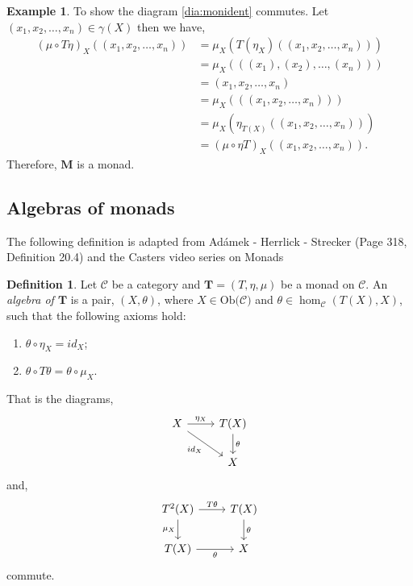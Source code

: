 \documentclass[11pt,a4paper]{article}
\theoremstyle{definition}
\newtheorem{definition}[thm]{Definition}
\newtheorem{example}[thm]{Example}
\newcommand\ho[3][]{\hom_{#1}(#2,#3)}
\newcommand\ob[1]{\mathrm{Ob(}#1\mathrm{)}}
\newcommand\cat[1]{\mathscr{#1}}
\numberwithin{equation}{section}
\begin{document}
\begin{example}
    To show the diagram \eqref{dia:monident} commutes.
    Let $(x_1,x_2,\dots,x_n)\in\gamma(X)$ then we have,
    \begin{align*}
        (\mu \circ T\eta)_X((x_1,x_2,\dots,x_n)) &= \mu_X (T(\eta_{X})((x_1,x_2,\dots,x_n))) \\
        &= \mu_{X}(((x_1),(x_2),\dots,(x_n))) \\
        &= (x_1,x_2,\dots,x_n) \\
        &= \mu_{X}(((x_1,x_2,\dots,x_n))) \\
        &= \mu_{X}(\eta_{T(X)}((x_1,x_2,\dots,x_n)))\\
        &= (\mu \circ \eta T)_{X}((x_1,x_2,\dots,x_n)).
    \end{align*}
    Therefore, $\mathbf{M}$ is a monad.
\end{example}

\subsection{Algebras of monads}
\label{ss:algofmon} 

The following definition is adapted from Adámek - Herrlick - Strecker \cite{ACC} (Page 318, Definition 20.4) and the Casters video series on Monads \cite{catsters:mon}
\begin{definition}
\label{def:algofmon}
    Let $\cat{C}$ be a category and $\mathbf{T} = (T,\eta,\mu)$ be a monad on $\cat{C}$. An \emph{algebra of $\mathbf{T}$} is a pair, $(X,\theta)$, where $X\in\ob{\cat{C}}$ and $\theta\in\ho[\cat{C}]{T(X)}{X}$, such that the following axioms hold:
    \begin{enumerate}
        \item $\theta \circ \eta_{X} = id_{X}$;
        \item $\theta \circ T\theta = \theta \circ \mu_{X}$.
    \end{enumerate}
    That is the diagrams,
    \begin{equation}
    \label{dia:monalgident}
        \begin{tikzcd}
            X \arrow[dr,"id_{X}"'] \arrow[r,"\eta_{X}"]& T(X) \arrow[d,"\theta"] \\
            & X
        \end{tikzcd}
    \end{equation}
    and,
    \begin{equation}
    \label{dia:monalgasso}
        \begin{tikzcd}
            T^2(X) \arrow[r,"T\theta"] \arrow[d,"\mu_{X}"'] & T(X) \arrow[d,"\theta"]\\
            T(X) \arrow[r,"\theta"']& X 
        \end{tikzcd}
    \end{equation}
    commute.
\end{definition}
\end{document}
